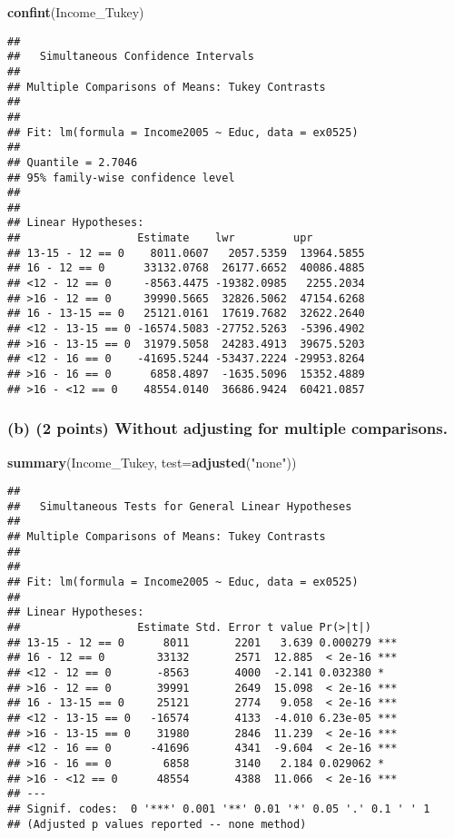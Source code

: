 \documentclass[]{article}
\newenvironment{Shaded}{\begin{snugshade}}{\end{snugshade}}
\newcommand{\KeywordTok}[1]{\textcolor[rgb]{0.13,0.29,0.53}{\textbf{#1}}}
\newcommand{\DataTypeTok}[1]{\textcolor[rgb]{0.13,0.29,0.53}{#1}}
\newcommand{\StringTok}[1]{\textcolor[rgb]{0.31,0.60,0.02}{#1}}
\newcommand{\NormalTok}[1]{#1}
\begin{document}
\begin{Shaded}
\begin{Highlighting}[]
\KeywordTok{confint}\NormalTok{(Income_Tukey)}
\end{Highlighting}
\end{Shaded}

\begin{verbatim}
## 
##   Simultaneous Confidence Intervals
## 
## Multiple Comparisons of Means: Tukey Contrasts
## 
## 
## Fit: lm(formula = Income2005 ~ Educ, data = ex0525)
## 
## Quantile = 2.7046
## 95% family-wise confidence level
##  
## 
## Linear Hypotheses:
##                  Estimate    lwr         upr        
## 13-15 - 12 == 0    8011.0607   2057.5359  13964.5855
## 16 - 12 == 0      33132.0768  26177.6652  40086.4885
## <12 - 12 == 0     -8563.4475 -19382.0985   2255.2034
## >16 - 12 == 0     39990.5665  32826.5062  47154.6268
## 16 - 13-15 == 0   25121.0161  17619.7682  32622.2640
## <12 - 13-15 == 0 -16574.5083 -27752.5263  -5396.4902
## >16 - 13-15 == 0  31979.5058  24283.4913  39675.5203
## <12 - 16 == 0    -41695.5244 -53437.2224 -29953.8264
## >16 - 16 == 0      6858.4897  -1635.5096  15352.4889
## >16 - <12 == 0    48554.0140  36686.9424  60421.0857
\end{verbatim}

\subsubsection{(b) (2 points) Without adjusting for multiple
comparisons.}\label{b-2-points-without-adjusting-for-multiple-comparisons.}

\begin{Shaded}
\begin{Highlighting}[]
\KeywordTok{summary}\NormalTok{(Income_Tukey, }\DataTypeTok{test=}\KeywordTok{adjusted}\NormalTok{(}\StringTok{"none"}\NormalTok{))}
\end{Highlighting}
\end{Shaded}

\begin{verbatim}
## 
##   Simultaneous Tests for General Linear Hypotheses
## 
## Multiple Comparisons of Means: Tukey Contrasts
## 
## 
## Fit: lm(formula = Income2005 ~ Educ, data = ex0525)
## 
## Linear Hypotheses:
##                  Estimate Std. Error t value Pr(>|t|)    
## 13-15 - 12 == 0      8011       2201   3.639 0.000279 ***
## 16 - 12 == 0        33132       2571  12.885  < 2e-16 ***
## <12 - 12 == 0       -8563       4000  -2.141 0.032380 *  
## >16 - 12 == 0       39991       2649  15.098  < 2e-16 ***
## 16 - 13-15 == 0     25121       2774   9.058  < 2e-16 ***
## <12 - 13-15 == 0   -16574       4133  -4.010 6.23e-05 ***
## >16 - 13-15 == 0    31980       2846  11.239  < 2e-16 ***
## <12 - 16 == 0      -41696       4341  -9.604  < 2e-16 ***
## >16 - 16 == 0        6858       3140   2.184 0.029062 *  
## >16 - <12 == 0      48554       4388  11.066  < 2e-16 ***
## ---
## Signif. codes:  0 '***' 0.001 '**' 0.01 '*' 0.05 '.' 0.1 ' ' 1
## (Adjusted p values reported -- none method)
\end{verbatim}
\end{document}
